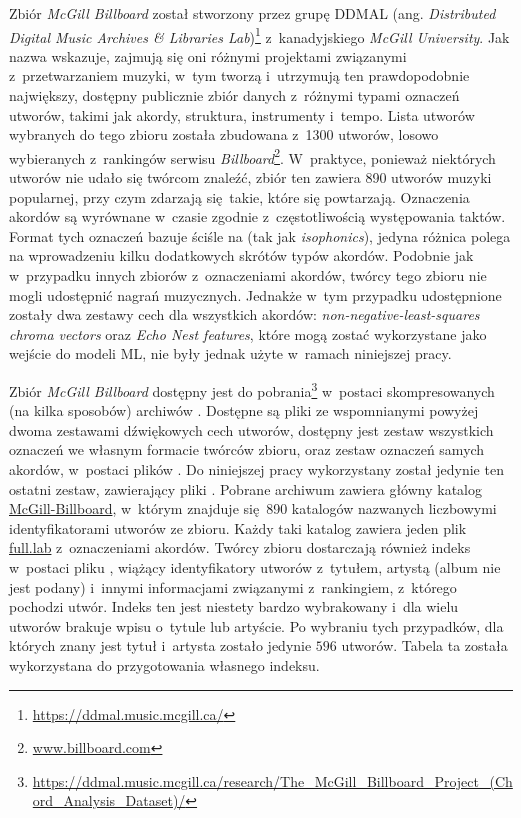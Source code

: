 Zbiór \emph{McGill Billboard} \cite{burgoyne_expert_2011} został stworzony przez grupę DDMAL (ang. \emph{Distributed Digital Music Archives \& Libraries Lab})\footnote{\url{https://ddmal.music.mcgill.ca/}} z~kanadyjskiego \emph{McGill University}. Jak nazwa wskazuje, zajmują się oni różnymi projektami związanymi z~przetwarzaniem muzyki, w~tym tworzą i~utrzymują ten prawdopodobnie największy, dostępny publicznie zbiór danych z~różnymi typami oznaczeń utworów, takimi jak akordy, struktura, instrumenty i~tempo. Lista utworów wybranych do tego zbioru została zbudowana z~1300 utworów, losowo wybieranych z~rankingów serwisu \emph{Billboard}\footnote{\url{www.billboard.com}}. W~praktyce, ponieważ niektórych utworów nie udało się twórcom znaleźć, zbiór ten zawiera 890 utworów muzyki popularnej, przy czym zdarzają się takie, które się powtarzają. Oznaczenia akordów są wyrównane w~czasie zgodnie z~częstotliwością występowania taktów. Format tych oznaczeń bazuje ściśle na \cite{harte_towards_nodate} (tak jak \emph{isophonics}), jedyna różnica polega na wprowadzeniu kilku dodatkowych skrótów typów akordów.  Podobnie jak w~przypadku innych zbiorów z~oznaczeniami akordów, twórcy tego zbioru nie mogli udostępnić nagrań muzycznych. Jednakże w~tym przypadku udostępnione zostały dwa zestawy cech dla wszystkich akordów: \emph{non-negative-least-squares chroma vectors} oraz \emph{Echo Nest features}, które mogą zostać wykorzystane jako wejście do modeli ML, nie były jednak użyte w~ramach niniejszej pracy.

Zbiór \emph{McGill Billboard} dostępny jest do pobrania\footnote{\url{https://ddmal.music.mcgill.ca/research/The_McGill_Billboard_Project_(Chord_Analysis_Dataset)/}} w~postaci skompresowanych (na kilka sposobów) archiwów . Dostępne są pliki ze wspomnianymi powyżej dwoma zestawami dźwiękowych cech utworów, dostępny jest zestaw wszystkich oznaczeń we własnym formacie twórców zbioru, oraz zestaw oznaczeń samych akordów, w~postaci plików .  Do niniejszej pracy wykorzystany został jedynie ten ostatni zestaw, zawierający pliki . Pobrane archiwum zawiera główny katalog \url{McGill-Billboard}, w~którym znajduje się 890 katalogów nazwanych liczbowymi identyfikatorami utworów ze zbioru. Każdy taki katalog zawiera jeden plik \url{full.lab} z~oznaczeniami akordów. Twórcy zbioru dostarczają również indeks w~postaci pliku , wiążący identyfikatory utworów z~tytułem, artystą (album nie jest podany) i~innymi informacjami związanymi z~rankingiem, z~którego pochodzi utwór. Indeks ten jest niestety bardzo wybrakowany i~dla wielu utworów brakuje wpisu o~tytule lub artyście. Po wybraniu tych przypadków, dla których znany jest tytuł i~artysta zostało jedynie $596$ utworów. Tabela ta została wykorzystana do przygotowania własnego indeksu.


